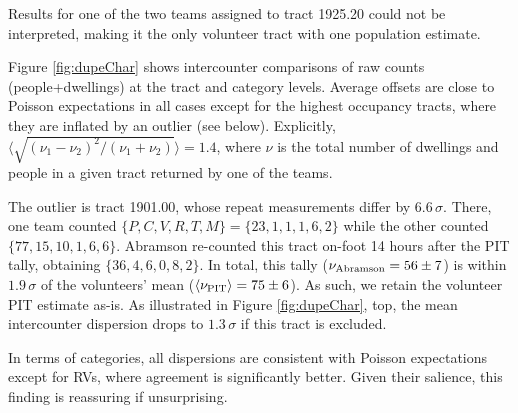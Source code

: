 \documentclass[11pt,twocolumn]{article}
\begin{document}
Results for one of the two teams assigned to tract 1925.20 could not be interpreted, making it the only
volunteer tract with one population estimate.

Figure \ref{fig:dupeChar} shows intercounter comparisons of raw counts (people+dwellings)
at the tract and category levels. Average offsets are close to Poisson expectations in all cases 
except for the highest occupancy tracts, where they are inflated by an outlier (see below).
Explicitly, $\langle\sqrt{(\nu_{1}-\nu_{2})^{2}/(\nu_{1} + \nu_{2})}\rangle=1.4$, where
$\nu$ is the total number of dwellings and people in a given tract returned by one of the teams. 

The outlier is tract 1901.00, whose repeat measurements differ by $6.6\,\sigma$. There, 
one team counted $\{P,C,V,R,T,M\}=\{23,1,1,1,6,2\}$ while the other counted $\{77,15,10,1,6,6\}$. 
Abramson re-counted this tract on-foot 14 hours after the PIT tally, obtaining $\{36, 4, 6, 0, 8, 2\}$.
In total, this tally ($\nu_{\rm Abramson}=56\pm7$) is within $1.9\,\sigma$ of the volunteers' mean 
($\langle\nu_{\rm PIT}\rangle=75\pm6$). As such, we retain the volunteer PIT estimate as-is. As illustrated in 
Figure \ref{fig:dupeChar}, top, the mean intercounter dispersion drops to $1.3\,\sigma$ if this tract is 
excluded.

In terms of categories, all dispersions are consistent with Poisson expectations except for RVs, where 
agreement is significantly better. Given their salience, this finding is reassuring if unsurprising.


\end{document}
